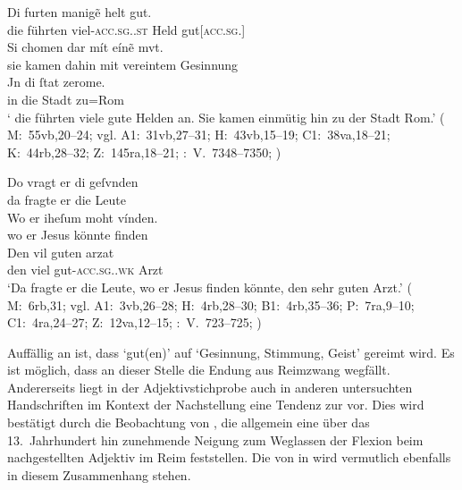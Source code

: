 \begin{exe}
\ex \label{ex:maccadj}
	\begin{xlist}
	\ex \label{ex:maccadj_1}
		\gll Di furten manigẽ helt gut. \\
			die führten viel-\textsc{acc.sg.\MascM.st} Held
			gut[\textsc{acc.sg.\MascM}] \\
	\sn \gll Si chomen dar mít eínẽ mvt. \\
			sie kamen dahin mit vereintem Gesinnung \\
	\sn \gll Jn di ſtat zerome. \\
			in die Stadt zu=Rom \\
		\trans `\textelp{} die führten viele gute Helden an. Sie kamen einmütig
			hin zu der Stadt Rom.'
			(%
				M:~55vb,20--24; vgl.
				A1:~31vb,27--31;
				H:~43vb,15--19;
				C1:~38va,18--21;
				K:~44rb,28--32;
				Z:~145ra,18--21;
				\KC:~V.~7348--7350;
				\cite[216]{schroeder1895}%
			)

	\ex \label{ex:maccadj_2}
		\gll Do vragt er di geſvnden \\
			da fragte er die Leute \\
	\sn \gll Wo er iheſum moht vínden. \\
			wo er Jesus könnte finden \\
	\sn \gll Den vil guten arzat \\
			den viel gut-\textsc{acc.sg.\MascM.wk} Arzt \\
		\trans `Da fragte er die Leute, wo er Jesus finden
			könnte, den sehr guten Arzt.'
			(%
				M:~6rb,31; vgl.
				A1:~3vb,26--28;
				H:~4rb,28--30;
				B1:~4rb,35--36;
				P:~7ra,9--10;
				C1:~4ra,24--27;
				Z:~12va,12--15;
				\KC:~V.~723--725;
				\cite[94]{schroeder1895}%
			)
		\\
	\end{xlist}
\end{exe}

Auffällig an  ist, dass  `gut(en)' auf
 `Gesinnung, Stimmung, Geist' gereimt wird. Es ist möglich, dass an
dieser Stelle die Endung aus Reimzwang wegfällt. Andererseits liegt in der
Adjektivstichprobe auch in anderen untersuchten Handschriften im Kontext der
Nachstellung eine Tendenz zur  vor. Dies wird bestätigt
durch die Beobachtung von \citet[241]{ksw2}, die allgemein eine über das
13.~Jahrhundert hin zunehmende Neigung zum Weglassen der Flexion beim
nachgestellten Adjektiv im Reim feststellen. Die
 von  in  wird vermutlich
ebenfalls in diesem Zusammenhang stehen.

